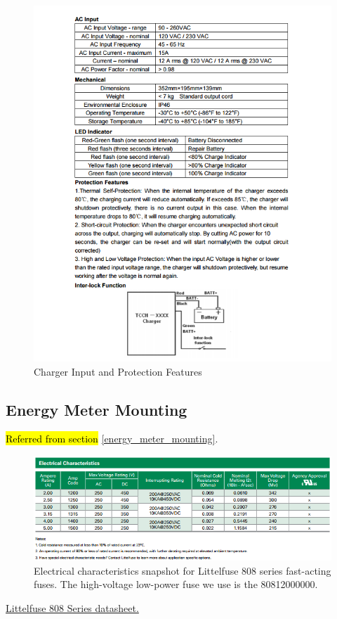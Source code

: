 \documentclass{article}
\DeclareRobustCommand{\hlr}[1]{{\sethlcolor{pink}\hl{#1}}}
\begin{document}
\begin{figure}[H]
	\includegraphics[width=\linewidth]{charger_input}
	\caption{Charger Input and Protection Features} 
\end{figure}

\subsection{Energy Meter Mounting}\label{appendix_energy_meter_mounting}
\hlr{Referred from section }\ref{energy_meter_mounting}.

\begin{figure} [H]
	\centering  %
	\includegraphics[width=\textwidth]{Littelfuse_808_electrical_characteristics.png}
	\caption{Electrical characteristics snapshot for Littelfuse 808 series fast-acting fuses. The high-voltage low-power fuse we use is the 80812000000.}	
	\label{fig:littelfuse_808}
\end{figure}

\href{http://www.littelfuse.com/~/media/c635bf51279f4ef6bedee5deb356e102.ashx}{Littelfuse 808 Series datasheet.}
\end{document}
